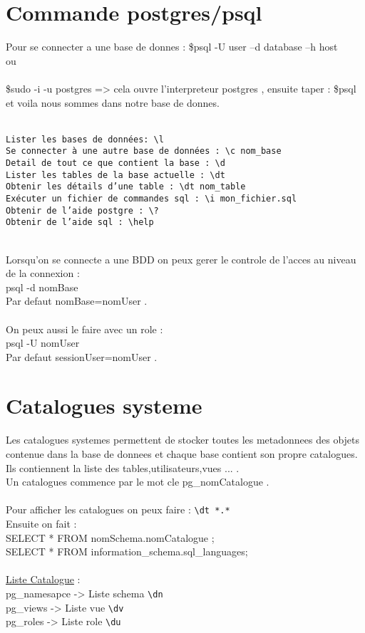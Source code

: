 \documentclass[a4paper,12pt,openany]{book}
\begin{document}
\section{Commande postgres/psql}

Pour se connecter a une base de donnes : \$psql -U user –d database –h host \\
ou\\
\\
\$sudo -i -u postgres => cela ouvre l'interpreteur postgres , ensuite taper : \$psql et voila nous sommes dans notre base de donnes.\\
\\
\begin{verbatim}
Lister les bases de données: \l
Se connecter à une autre base de données : \c nom_base
Detail de tout ce que contient la base : \d 
Lister les tables de la base actuelle : \dt
Obtenir les détails d’une table : \dt nom_table
Exécuter un fichier de commandes sql : \i mon_fichier.sql
Obtenir de l’aide postgre : \?
Obtenir de l’aide sql : \help
\end{verbatim}
\\
Lorsqu'on se connecte a une BDD on peux gerer le controle de l'acces au niveau de la connexion : \\
psql -d nomBase \\
Par defaut nomBase=nomUser .\\
\\
On peux aussi le faire avec un role : \\
psql -U nomUser \\
Par defaut sessionUser=nomUser .\\

\section{Catalogues systeme}
Les catalogues systemes permettent de stocker toutes les metadonnees des objets contenue dans la base de donnees et chaque base contient son propre catalogues.\\
Ils contiennent la liste des tables,utilisateurs,vues ... .\\
Un catalogues commence par le mot cle pg\_nomCatalogue .\\
\\
Pour afficher les catalogues on peux faire : \verb+\dt *.*+ \\
Ensuite on fait : \\
SELECT * FROM nomSchema.nomCatalogue ;\\
SELECT * FROM information\_schema.sql\_languages;\\
\\
\underline{Liste Catalogue} : \\
pg\_namesapce -> Liste schema \verb+\dn+ \\
pg\_views -> Liste vue \verb+\dv+ \\
pg\_roles -> Liste role \verb+\du+ \\
\end{document}
